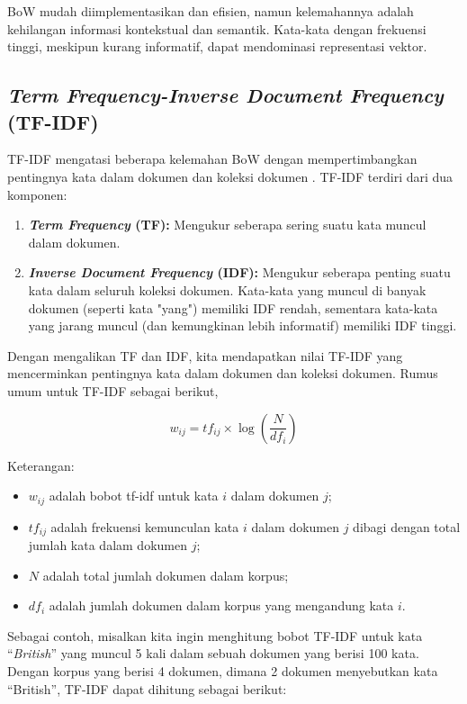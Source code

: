 BoW mudah diimplementasikan dan efisien, namun kelemahannya adalah kehilangan informasi kontekstual dan semantik. Kata-kata dengan frekuensi tinggi, meskipun kurang informatif, dapat mendominasi representasi vektor.

\subsection{\textit{Term Frequency-Inverse Document Frequency} (TF-IDF)}

TF-IDF mengatasi beberapa kelemahan BoW dengan mempertimbangkan pentingnya kata dalam dokumen dan koleksi dokumen \cite{qaiserTextMiningUse2018}. TF-IDF terdiri dari dua komponen:

\begin{enumerate}
    \item \textbf{\textit{Term Frequency} (TF): } Mengukur seberapa sering suatu kata muncul dalam dokumen.
    \item \textbf{\textit{Inverse Document Frequency} (IDF): } Mengukur seberapa penting suatu kata dalam seluruh koleksi dokumen. Kata-kata yang muncul di banyak dokumen (seperti kata "yang") memiliki IDF rendah, sementara kata-kata yang jarang muncul (dan kemungkinan lebih informatif) memiliki IDF tinggi.
\end{enumerate}

Dengan mengalikan TF dan IDF, kita mendapatkan nilai TF-IDF yang mencerminkan pentingnya kata dalam dokumen dan koleksi dokumen. Rumus umum untuk TF-IDF sebagai berikut, 

\begin{equation}
w_{ij} = tf_{ij} \times \log \left(\frac{N}{df_i}\right)
\end{equation}

Keterangan:

\begin{itemize}
    \item $w_{ij}$ adalah bobot tf-idf untuk kata $i$ dalam dokumen $j$;
    \item $tf_{ij}$ adalah frekuensi kemunculan kata $i$ dalam dokumen $j$ dibagi dengan total jumlah kata dalam dokumen $j$;
    \item $N$ adalah total jumlah dokumen dalam korpus;
    \item $df_i$ adalah jumlah dokumen dalam korpus yang mengandung kata $i$.
\end{itemize}

Sebagai contoh, misalkan kita ingin menghitung bobot TF-IDF untuk kata “\textit{British}” yang muncul 5 kali dalam sebuah dokumen yang berisi 100 kata. Dengan korpus yang berisi 4 dokumen, dimana 2 dokumen menyebutkan kata “British”, TF-IDF dapat dihitung sebagai berikut:

